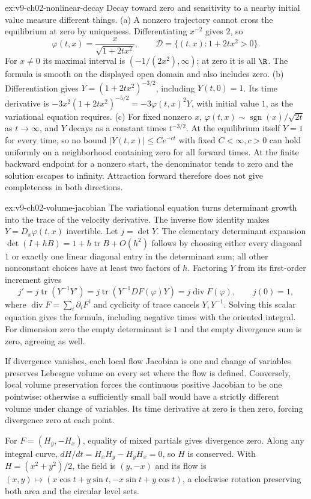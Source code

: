 \begin{solution}{ex:v9-ch02-nonlinear-decay}
\idea Decay toward zero and sensitivity to a nearby initial value measure different things.
\writeup (a) A nonzero trajectory cannot cross the equilibrium at zero by uniqueness. Differentiating $x^{-2}$ gives $2$, so
\[
\varphi(t,x)=\frac{x}{\sqrt{1+2tx^2}},\qquad
\mathcal D=\{(t,x):1+2tx^2>0\}.
\]
For $x\ne0$ its maximal interval is $(-1/(2x^2),\infty)$; at zero it is all $\R$. The formula is smooth on the displayed open domain and also includes zero.
(b) Differentiation gives $Y=(1+2tx^2)^{-3/2}$, including $Y(t,0)=1$. Its time derivative is $-3x^2(1+2tx^2)^{-5/2}=-3\varphi(t,x)^2Y$, with initial value $1$, as the variational equation requires.
(c) For fixed nonzero $x$, $\varphi(t,x)\sim\operatorname{sgn}(x)/\sqrt{2t}$ as $t\to\infty$, and $Y$ decays as a constant times $t^{-3/2}$. At the equilibrium itself $Y=1$ for every time, so no bound $|Y(t,x)|\le Ce^{-ct}$ with fixed $C<\infty,c>0$ can hold uniformly on a neighborhood containing zero for all forward times. At the finite backward endpoint for a nonzero start, the denominator tends to zero and the solution escapes to infinity. Attraction forward therefore does not give completeness in both directions.
\end{solution}

\begin{solution}{ex:v9-ch02-volume-jacobian}
\idea The variational equation turns determinant growth into the trace of the velocity derivative.
\writeup The inverse flow identity makes $Y=D_x\varphi(t,x)$ invertible. Let $j=\det Y$. The elementary determinant expansion $\det(I+hB)=1+h\operatorname{tr}B+O(h^2)$ follows by choosing either every diagonal $1$ or exactly one linear diagonal entry in the determinant sum; all other nonconstant choices have at least two factors of $h$. Factoring $Y$ from its first-order increment gives
\[
j'=j\operatorname{tr}(Y^{-1}Y')
=j\operatorname{tr}(Y^{-1}DF(\varphi)Y)
=j\operatorname{div}F(\varphi),\qquad j(0)=1,
\]
where $\operatorname{div}F=\sum_i\partial_iF^i$ and cyclicity of trace cancels $Y,Y^{-1}$. Solving this scalar equation gives the formula, including negative times with the oriented integral. For dimension zero the empty determinant is $1$ and the empty divergence sum is zero, agreeing as well.

If divergence vanishes, each local flow Jacobian is one and change of variables preserves Lebesgue volume on every set where the flow is defined. Conversely, local volume preservation forces the continuous positive Jacobian to be one pointwise: otherwise a sufficiently small ball would have a strictly different volume under change of variables. Its time derivative at zero is then zero, forcing divergence zero at each point.

For $F=(H_y,-H_x)$, equality of mixed partials gives divergence zero. Along any integral curve, $dH/dt=H_xH_y-H_yH_x=0$, so $H$ is conserved. With $H=(x^2+y^2)/2$, the field is $(y,-x)$ and its flow is
$(x,y)\mapsto(x\cos t+y\sin t,-x\sin t+y\cos t)$,
a clockwise rotation preserving both area and the circular level sets.
\end{solution}

